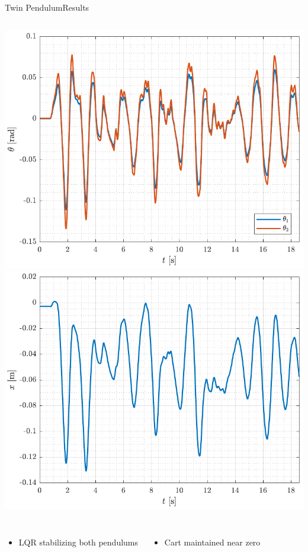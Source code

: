 \begin{frame}{Twin Pendulum}{Results}
  \begin{columns}[c]
      \includegraphics[width=1\textwidth]{figures/thetaCatch}
      \includegraphics[width=1\textwidth]{figures/xCatch}
  \end{columns}
  \begin{columns}[c]
    \begin{itemize}\vspace{12pt}
      \item LQR stabilizing both pendulums
    \end{itemize}
    \begin{itemize}\centering
      \item Cart maintained near zero
    \end{itemize}
  \end{columns}
\end{frame}

